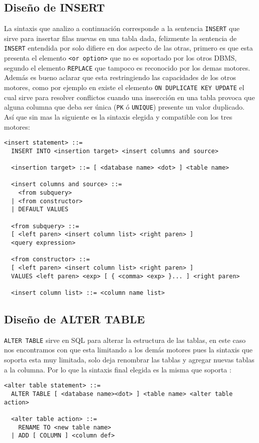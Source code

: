 \subsection{Diseño de INSERT}
La sintaxis que analizo a continuación corresponde a la sentencia \verb=INSERT= que sirve para insertar filas nuevas en una tabla dada, felizmente la sentencia de \verb=INSERT= entendida por \s solo difiere en dos aspecto de las otras, primero es que esta presenta el elemento \verb=<or option>= que no es soportado por los otros DBMS, segundo el elemento \verb=REPLACE= que tampoco es reconocido por los demas motores. Además es bueno aclarar que \s esta restringiendo las capacidades de los otros motores, como por ejemplo en \m existe el elemento \verb=ON DUPLICATE KEY UPDATE= el cual sirve para resolver conflictos cuando una insercción en una tabla provoca que alguna columna que deba ser única (\verb=PK= ó \verb=UNIQUE=) presente un valor duplicado. Así que sin mas la siguiente es la sintaxis elegida y compatible con los tres motores:

\begin{Verbatim}[frame=single, label=sintaxis para INSERT]
  <insert statement> ::=
  INSERT INTO <insertion target> <insert columns and source>

  <insertion target> ::= [ <database name> <dot> ] <table name>

  <insert columns and source> ::=
    <from subquery>
  | <from constructor>
  | DEFAULT VALUES

  <from subquery> ::=
  [ <left paren> <insert column list> <right paren> ]
  <query expression>
  
  <from constructor> ::=
  [ <left paren> <insert column list> <right paren> ]
  VALUES <left paren> <exp> [ { <comma> <exp> }... ] <right paren>

  <insert column list> ::= <column name list>
\end{Verbatim}




\subsection{Diseño de ALTER TABLE}
\verb=ALTER TABLE= sirve en SQL para alterar la estructura de las tablas, en este caso nos encontramos con que \s esta limitando a los demás motores pues la sintaxis que soporta esta muy limitada, solo deja renombrar las tablas y agregar nuevas tablas a la columna. Por lo que la sintaxis final elegida es la misma que soporta \s:
%  
\begin{Verbatim}[frame=single, label=sintaxis para ALTER TABLE]
<alter table statement> ::= 
  ALTER TABLE [ <database name><dot> ] <table name> <alter table action>
  
  <alter table action> ::=
    RENAME TO <new table name>
  | ADD [ COLUMN ] <column def>
\end{Verbatim}




